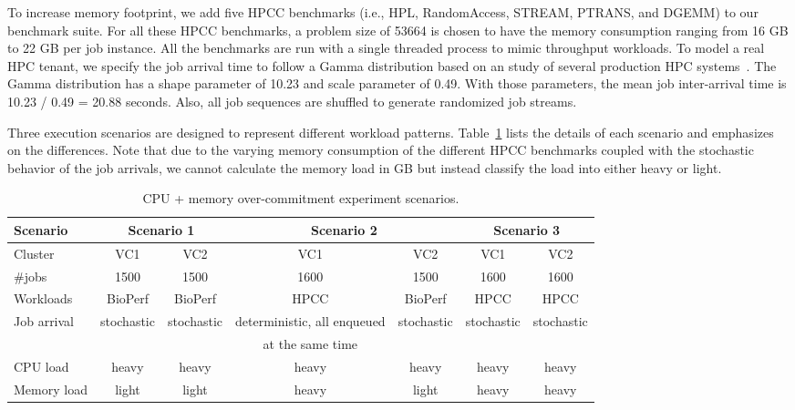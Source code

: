 To increase memory footprint, we add five HPCC benchmarks (i.e., HPL, RandomAccess, STREAM, PTRANS, and DGEMM) to our benchmark suite. For all these HPCC benchmarks, a problem size of 53664 is chosen to have the memory consumption ranging from 16 GB to 22 GB per job instance. All the benchmarks are run with a single threaded process to mimic throughput workloads. 
To model a real HPC tenant, we specify the job arrival time to follow a Gamma distribution based on an study of several production HPC systems~\cite{lublin2003workload}.  
The Gamma distribution has a shape parameter of 10.23 and scale parameter of 0.49. With those parameters, the mean job inter-arrival time is 10.23 / 0.49 = 20.88 seconds. 
Also, all job sequences are shuffled to generate randomized job streams. %

Three execution scenarios are designed to represent different workload patterns. 
Table~\ref{tbl:scenarios} lists the details of each scenario and emphasizes on the differences.
Note that due to the varying memory consumption of the different HPCC benchmarks coupled with the stochastic behavior of the job arrivals, we cannot calculate the memory load in GB but instead classify the load into either heavy or light.  

\begin{table}[!h]\small
  \caption{CPU + memory over-commitment experiment scenarios.}
  \centering
    \begin{tabular}{|l|c|c|c|c|c|c|}
    \hline
    Scenario & \multicolumn{2}{|c|}{Scenario 1} & \multicolumn{2}{|c|}{Scenario 2} & \multicolumn{2}{|c|}{Scenario 3} \\
    \hline
    Cluster & VC1 & VC2 & VC1 & VC2 & VC1 & VC2 \\
    \hline
    \#jobs & 1500 & 1500 & 1600 & 1500 & 1600 & 1600 \\
    \hline
    Workloads & BioPerf & BioPerf & HPCC & BioPerf & HPCC & HPCC \\
    \hline
    \multirow{2}{*}{Job arrival} & \multirow{2}{*}{stochastic} & \multirow{2}{*}{stochastic} & deterministic, all enqueued & \multirow{2}{*}{stochastic} & \multirow{2}{*}{stochastic} & \multirow{2}{*}{stochastic} \\
                                & &  & at the same time & & & \\
    \hline
    CPU load & heavy & heavy & heavy & heavy & heavy & heavy\\
    \hline
    Memory load & light & light & heavy & light & heavy & heavy \\
    \hline
    \end{tabular}
  \label{tbl:scenarios}
\end{table}

